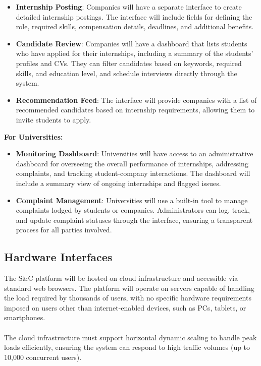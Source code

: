 \begin{itemize}
    \item \textbf{Internship Posting}: Companies will have a separate interface to create detailed internship postings. The interface will include fields for defining the role, required skills, compensation details, deadlines, and additional benefits.
    \item \textbf{Candidate Review}: Companies will have a dashboard that lists students who have applied for their internships, including a summary of the students' profiles and CVs. They can filter candidates based on keywords, required skills, and education level, and schedule interviews directly through the system. 
    \item \textbf{Recommendation Feed}: The interface will provide companies with a list of recommended candidates based on internship requirements, allowing them to invite students to apply.
\end{itemize} 
\vspace{5mm}
\textbf{For Universities:}
\begin{itemize}
    \item \textbf{Monitoring Dashboard}: Universities will have access to an administrative dashboard for overseeing the overall performance of internships, addressing complaints, and tracking student-company interactions. The dashboard will include a summary view of ongoing internships and flagged issues.
    \item \textbf{Complaint Management}: Universities will use a built-in tool to manage complaints lodged by students or companies. Administrators can log, track, and update complaint statuses through the interface, ensuring a transparent process for all parties involved.
\end{itemize}

\subsection{Hardware Interfaces}

The S\&C platform will be hosted on cloud infrastructure and accessible via standard web browsers. The platform will operate on servers capable of handling the load required by thousands of users, with no specific hardware requirements imposed on users other than internet-enabled devices, such as PCs, tablets, or smartphones.\\ \\
The cloud infrastructure must support horizontal dynamic scaling to handle peak loads efficiently, ensuring the system can respond to high traffic volumes (up to 10,000 concurrent users).

